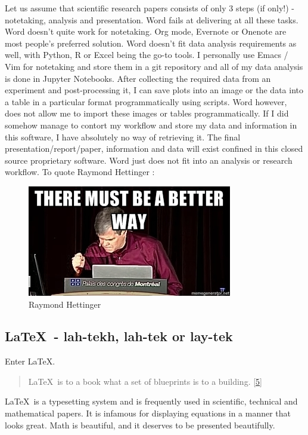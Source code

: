 \documentclass[journal,10pt,final]{IEEEtran}
\begin{document}
Let us assume that scientific research papers consists of only 3 steps
(if only!) - notetaking, analysis and presentation. Word fails at
delivering at all these tasks. Word doesn't quite work for notetaking.
Org mode, Evernote or Onenote are most people's preferred solution. Word
doesn't fit data analysis requirements as well, with Python, R or Excel
being the go-to tools. I personally use Emacs / Vim for notetaking and
store them in a git repository and all of my data analysis is done in
Jupyter Notebooks. After collecting the required data from an experiment
and post-processing it, I can save plots into an image or the data into
a table in a particular format programmatically using scripts. Word
however, does not allow me to import these images or tables
programmatically. If I did somehow manage to contort my workflow and
store my data and information in this software, I have absolutely no way
of retrieving it. The final presentation/report/paper, information and
data will exist confined in this closed source proprietary software.
Word just does not fit into an analysis or research workflow. To quote
Raymond Hettinger :

\begin{figure}[htbp]
\centering
\includegraphics{../images/raymondhettinger.jpg}
\caption{Raymond Hettinger}
\end{figure}

\subsection{\texorpdfstring{\LaTeX~- lah-tekh, lah-tek or
lay-tek}{~- lah-tekh, lah-tek or lay-tek}}\label{lah-tekh-lah-tek-or-lay-tek}

Enter \LaTeX.

\begin{quote}
\LaTeX~is to a book what a set of blueprints is to a building.
{[}\protect\hyperlink{ref-ux5fstackoverflow}{5}{]}
\end{quote}

\LaTeX~is a typesetting system and is frequently used in scientific,
technical and mathematical papers. It is infamous for displaying
equations in a manner that looks great. Math is beautiful, and it
deserves to be presented beautifully.
\end{document}
